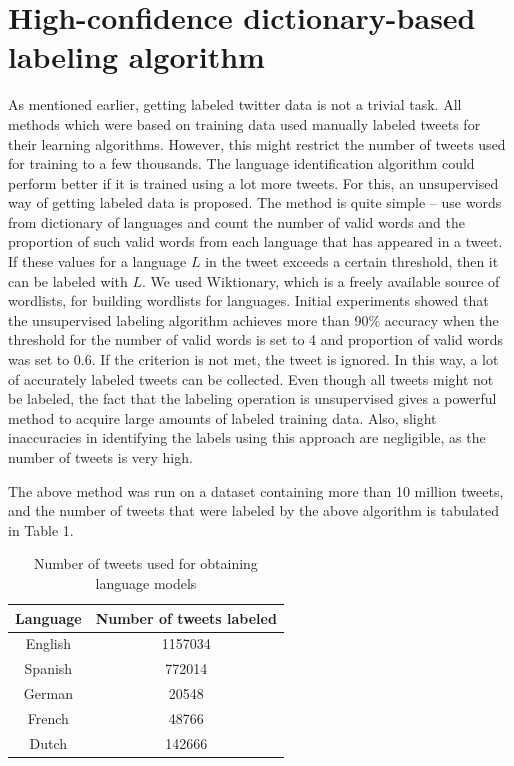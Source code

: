 \documentclass[11pt]{article}
\begin{document}
\section{High-confidence dictionary-based labeling algorithm}
As mentioned earlier, getting labeled twitter data is not a trivial task. All methods which were based on training data used manually labeled tweets for their learning algorithms. However, this might restrict the number of tweets used for training to a few thousands. The language identification algorithm could perform better if it is trained using a lot more tweets. For this, an unsupervised way of getting labeled data is proposed. The method is quite simple -- use words from dictionary of languages and count the number of valid words and the proportion of such valid words from each language that has appeared in a tweet. If these values for a language $L$ in the tweet exceeds a certain threshold, then it can be labeled with $L$. We used Wiktionary, which is a freely available source of wordlists, for building wordlists for languages. Initial experiments showed that the unsupervised labeling algorithm achieves more than 90\% accuracy when the threshold for the number of valid words is set to 4 and proportion of valid words was set to 0.6. If the criterion is not met, the tweet is ignored. In this way, a lot of accurately labeled tweets can be collected. Even though all tweets might not be labeled, the fact that the labeling operation is unsupervised gives a powerful method to acquire large amounts of labeled training data. Also, slight inaccuracies in identifying the labels using this approach are negligible, as the number of tweets is very high.

The above method was run on a dataset containing more than 10 million tweets, and the number of tweets that were labeled by the above algorithm is tabulated in Table 1.

\begin{table}
\begin{center}
\small
\begin{tabular}{|c|c|}
\hline
\textbf{Language} & \textbf{Number of tweets labeled} \\
\hline
English & 1157034 \\
Spanish & 772014 \\
German & 20548 \\
French & 48766 \\
Dutch & 142666 \\ \hline
\end{tabular}
\caption{\footnotesize Number of tweets used for obtaining language models}
\end{center}
\end{table}
\end{document}
